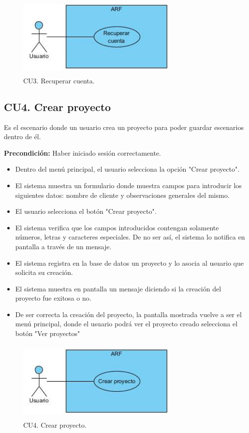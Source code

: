 \begin{figure}[h!]
	\centering
	\includegraphics[width=8cm,height=4cm]{imagenes/analisis/cu/recuperar_cuenta.jpg}
	\caption{CU3. Recuperar cuenta.}
	\label{fig:recuperarcuenta}
\end{figure} 

\subsection{CU4. Crear proyecto}\par
Es el escenario donde un usuario crea un proyecto para poder guardar escenarios dentro de él.\par
\textbf{Precondición:} Haber iniciado sesión correctamente.\par
\begin{itemize}
	\item Dentro del menú principal, el usuario selecciona la opción "Crear proyecto".
	\item El sistema muestra un formulario donde muestra campos para introducir los siguientes datos: nombre de cliente y observaciones generales del mismo.
	\item El usuario selecciona el botón "Crear proyecto".
	\item El sistema verifica que los campos introducidos contengan solamente números, letras y caracteres especiales. De no ser así, el sistema lo notifica en pantalla a través de un mensaje.
	\item El sistema registra en la base de datos un proyecto y lo asocia al usuario que solicita su creación.
	\item El sistema muestra en pantalla un mensaje diciendo si la creación del proyecto fue exitosa o no.
	\item De ser correcta la creación del proyecto, la pantalla mostrada vuelve a ser el menú principal, donde el usuario podrá ver el proyecto creado selecciona el botón "Ver proyectos"
\end{itemize}

\begin{figure}[h!]
	\centering
	\includegraphics[width=8cm,height=4cm]{imagenes/analisis/cu/crear_proyecto.jpg}
	\caption{CU4. Crear proyecto.}
	\label{fig:crearproyecto}
\end{figure} 

